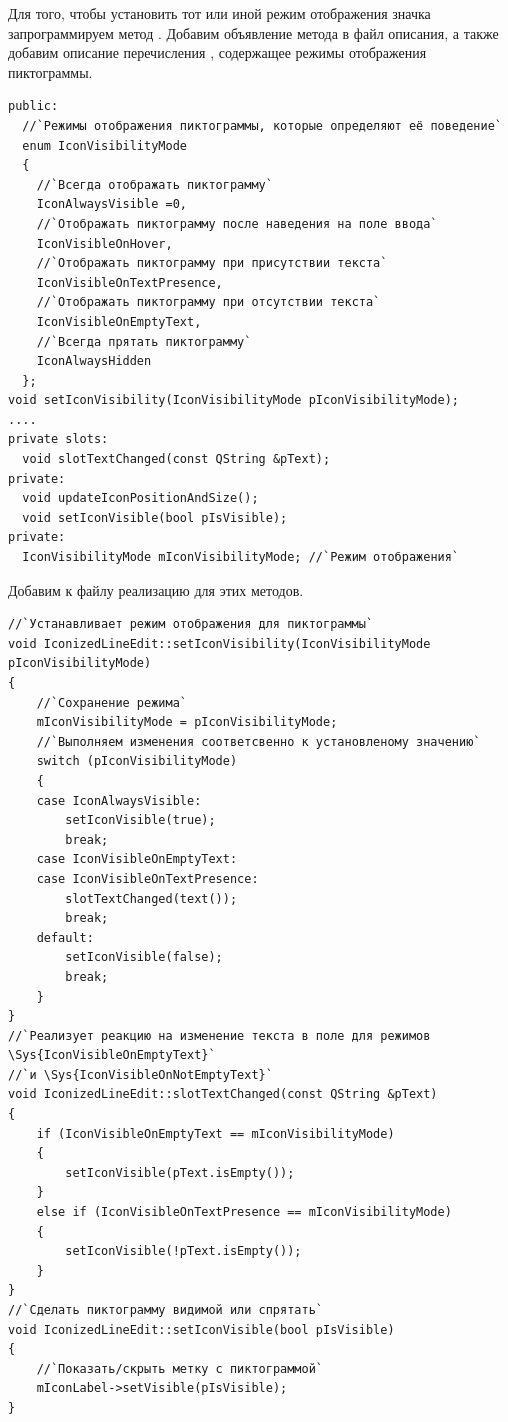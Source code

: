 Для того, чтобы установить тот или иной режим отображения значка запрограммируем метод .
Добавим объявление метода в файл описания, а также добавим описание перечисления ,
содержащее режимы отображения пиктограммы.
\begin{lstlisting}
public:
  //`Режимы отображения пиктограммы, которые определяют её поведение`
  enum IconVisibilityMode 
  {
    //`Всегда отображать пиктограмму`
    IconAlwaysVisible =0,
    //`Отображать пиктограмму после наведения на поле ввода`
    IconVisibleOnHover,
    //`Отображать пиктограмму при присутствии текста`
    IconVisibleOnTextPresence,
    //`Отображать пиктограмму при отсутствии текста`
    IconVisibleOnEmptyText,
    //`Всегда прятать пиктограмму`
    IconAlwaysHidden
  };
void setIconVisibility(IconVisibilityMode pIconVisibilityMode);
....
private slots:
  void slotTextChanged(const QString &pText);
private:
  void updateIconPositionAndSize();
  void setIconVisible(bool pIsVisible);
private:
  IconVisibilityMode mIconVisibilityMode; //`Режим отображения`
\end{lstlisting}

Добавим к файлу  реализацию для этих методов.

\begin{lstlisting}
//`Устанавливает режим отображения для пиктограммы`
void IconizedLineEdit::setIconVisibility(IconVisibilityMode pIconVisibilityMode)
{
    //`Сохранение режима`
    mIconVisibilityMode = pIconVisibilityMode;
    //`Выполняем изменения соответсвенно к установленому значению`
    switch (pIconVisibilityMode)
    {
    case IconAlwaysVisible:
        setIconVisible(true);
        break;
    case IconVisibleOnEmptyText:
    case IconVisibleOnTextPresence:
        slotTextChanged(text());
        break;
    default:
        setIconVisible(false);
        break;
    }
}
//`Реализует реакцию на изменение текста в поле для режимов \Sys{IconVisibleOnEmptyText}`
//`и \Sys{IconVisibleOnNotEmptyText}`
void IconizedLineEdit::slotTextChanged(const QString &pText)
{
    if (IconVisibleOnEmptyText == mIconVisibilityMode)
    {
        setIconVisible(pText.isEmpty());
    }
    else if (IconVisibleOnTextPresence == mIconVisibilityMode)
    {
        setIconVisible(!pText.isEmpty());
    }
}
//`Сделать пиктограмму видимой или спрятать`
void IconizedLineEdit::setIconVisible(bool pIsVisible)
{
    //`Показать/скрыть метку с пиктограммой`
    mIconLabel->setVisible(pIsVisible);
}
\end{lstlisting}


